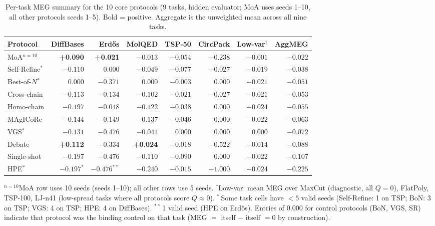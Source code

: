 \documentclass{article}
\begin{document}
\begin{table}[h]
\caption{Per-task MEG summary for the 10 core protocols (9 tasks, hidden evaluator; MoA uses seeds 1--10, all other protocols seeds 1--5). Bold = positive. Aggregate is the unweighted mean across all nine tasks.}
\centering
\small
\begin{tabular}{l r r r r r r r}
\toprule
Protocol & DiffBases & Erd\H{o}s & MolQED & TSP-50 & CircPack & Low-var$^\dagger$ & AggMEG \\
\midrule
MoA$^{n=10}$ & \textbf{+0.090} & \textbf{+0.021} & $-0.013$ & $-0.054$ & $-0.238$ & $-0.001$ & $-0.022$ \\
Self-Refine$^*$ & $-0.110$ & $0.000$ & $-0.049$ & $-0.077$ & $-0.027$ & $-0.019$ & $-0.038$ \\
Best-of-$N$$^*$ & $0.000$ & $-0.371$ & $0.000$ & $-0.003$ & $0.000$ & $-0.021$ & $-0.051$ \\
Cross-chain & $-0.113$ & $-0.134$ & $-0.102$ & $-0.021$ & $-0.027$ & $-0.021$ & $-0.053$ \\
Homo-chain & $-0.197$ & $-0.048$ & $-0.122$ & $-0.038$ & $0.000$ & $-0.024$ & $-0.055$ \\
MAgICoRe & $-0.144$ & $-0.149$ & $-0.137$ & $-0.046$ & $0.000$ & $-0.022$ & $-0.063$ \\
VGS$^*$ & $-0.131$ & $-0.476$ & $-0.041$ & $0.000$ & $0.000$ & $0.000$ & $-0.072$ \\
Debate & \textbf{+0.112} & $-0.334$ & \textbf{+0.024} & $-0.018$ & $-0.522$ & $-0.014$ & $-0.088$ \\
Single-shot & $-0.197$ & $-0.476$ & $-0.110$ & $-0.090$ & $0.000$ & $-0.022$ & $-0.107$ \\
HPE$^*$ & $-0.197^*$ & $-0.476^{**}$ & $-0.240$ & $-0.015$ & $-1.000$ & $-0.024$ & $-0.225$ \\
\bottomrule
\end{tabular}
\vspace{2pt}
{\footnotesize $^{n=10}$MoA row uses 10 seeds (seeds 1--10); all other rows use 5 seeds. $^\dagger$Low-var: mean MEG over MaxCut (diagnostic, all $Q{=}0$), FlatPoly, TSP-100, LJ-n41 (low-spread tasks where all protocols score $Q \approx 0$). $^*$\,Some task cells have $<5$ valid seeds (Self-Refine: 1 on TSP; BoN: 3 on TSP; VGS: 4 on TSP; HPE: 4 on DiffBases). $^{**}$\,1 valid seed (HPE on Erd\H{o}s). Entries of $0.000$ for control protocols (BoN, VGS, SR) indicate that protocol was the binding control on that task (MEG $=$ itself $-$ itself $= 0$ by construction).}
\end{table}
\end{document}
